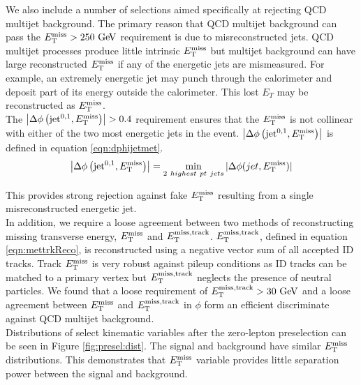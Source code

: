 
\indent We also include a number of selections aimed specifically at rejecting QCD multijet background.  The primary reason that QCD multijet background can pass the $\met > 250 \gev$ requirement is due to misreconstructed jets.  QCD multijet processes produce little intrinsic $E_{\mathrm{T}}^{\mathrm{miss}}$ but multijet background can have large reconstructed $E_{\mathrm{T}}^{\mathrm{miss}}$ if any of the energetic jets are mismeasured.  For example, an extremely energetic jet may punch through the calorimeter and deposit part of its energy outside the calorimeter.  This lost $E_T$ may be reconstructed as $E_{\mathrm{T}}^{\mathrm{miss}}$.  \\

\indent The $\left|\Delta\phi\left(\mathrm{jet}^{0,1},E_{\mathrm{T}}^{\mathrm{miss}}\right)\right| > 0.4$ requirement ensures that the $E_{\mathrm{T}}^{\mathrm{miss}}$ is not collinear with either of the two most energetic jets in the event.  $\left|\Delta\phi\left(\mathrm{jet}^{0,1},E_{\mathrm{T}}^{\mathrm{miss}}\right)\right|$ is defined in equation \ref{eqn:dphijetmet}. \\

\begin{equation}
\left|\Delta\phi\left(\mathrm{jet}^{0,1},E_{\mathrm{T}}^{\mathrm{miss}}\right)\right| = \min_{2~highest~pt~jets} |\Delta \phi ( jet, E_{\mathrm{T}}^{\mathrm{miss}} ) |
\label{eqn:dphijetmet}
\end{equation}

\indent This provides strong rejection against fake $E_{\mathrm{T}}^{\mathrm{miss}}$ resulting from a single misreconstructed energetic jet.  \\

\indent In addition, we require a loose agreement between two methods of reconstructing missing transverse energy, $E_{\mathrm{T}}^{\mathrm{miss}}$ and $E_{\mathrm{T}}^{\mathrm{miss, track}}$.  $E_{\mathrm{T}}^{\mathrm{miss, track}}$, defined in equation \ref{eqn:mettrkReco}, is reconstructed using a negative vector sum of all accepted ID tracks.  Track $E_{\mathrm{T}}^{\mathrm{miss}}$ is very robust against pileup conditions as ID tracks can be matched to a primary vertex but $E_{\mathrm{T}}^{\mathrm{miss, track}}$ neglects the presence of neutral particles.  We found that a loose requirement of $\mettrk > 30 \gev$ and a loose agreement between $E_{\mathrm{T}}^{\mathrm{miss}}$ and $E_{\mathrm{T}}^{\mathrm{miss, track}}$ in $\phi$ form an efficient discriminate against QCD multijet background. \\

\indent  Distributions of select kinematic variables after the zero-lepton preselection can be seen in Figure \ref{fig:presel:dist}.  The signal and background have similar $E_{\mathrm{T}}^{\mathrm{miss}}$ distributions.  This demonstrates that $E_{\mathrm{T}}^{\mathrm{miss}}$ variable provides little separation power between the signal and background. \\  


